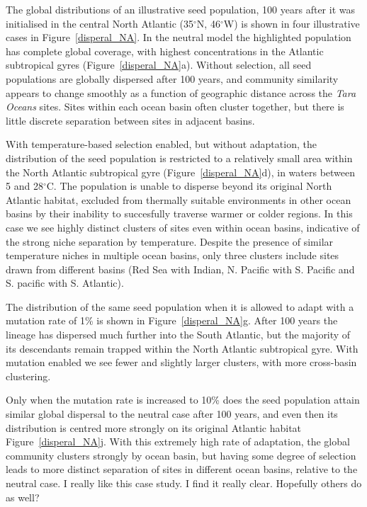 \documentclass[12pt]{article}
\newcommand{\sinead}[1]{{\color{green} #1}}
\begin{document}
The global distributions of an illustrative seed population, 100 years after it was initialised in the central North Atlantic (35$^\circ$N, 46$^\circ$W) is shown in four illustrative cases in Figure~\ref{disperal_NA}. In the neutral model the highlighted population has complete global coverage, with highest concentrations in the Atlantic subtropical gyres (Figure~\ref{disperal_NA}a). Without selection, all seed populations are globally dispersed after 100 years, and community similarity appears to change smoothly as a function of geographic distance across the \textit{Tara Oceans} sites. Sites within each ocean basin often cluster together, but there is little discrete separation between sites in adjacent basins.

With temperature-based selection enabled, but without adaptation, the distribution of the seed population is restricted to a relatively small area within the North Atlantic subtropical gyre (Figure~\ref{disperal_NA}d), in waters between 5 and 28$^\circ$C. The population is unable to disperse beyond its original North Atlantic habitat, excluded from thermally suitable environments in other ocean basins by their inability to succesfully traverse warmer or colder regions. In this case we see highly distinct clusters of sites even within ocean basins, indicative of the strong niche separation by temperature. Despite the presence of similar temperature niches in multiple ocean basins, only three clusters include sites drawn from different basins (Red Sea with Indian, N. Pacific with S. Pacific and S. pacific with S. Atlantic).

The distribution of the same seed population when it is allowed to adapt with a mutation rate of 1\% is shown in Figure~\ref{disperal_NA}g. After 100 years the lineage has dispersed much further into the South Atlantic, but the majority of its descendants remain trapped within the North Atlantic subtropical gyre. With mutation enabled we see fewer and slightly larger clusters, with more cross-basin clustering.

Only when the mutation rate is increased to 10\% does the seed population attain similar global dispersal to the neutral case after 100 years, and even then its distribution is centred more strongly on its original Atlantic habitat Figure~\ref{disperal_NA}j. With this extremely high rate of adaptation, the global community clusters strongly by ocean basin, but having some degree of selection leads to more distinct separation of sites in different ocean basins, relative to the neutral case. \sinead{I really like this case study. I find it really clear. Hopefully others do as well?}
\end{document}
